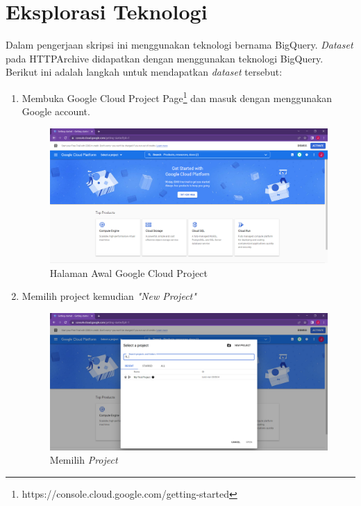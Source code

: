 \section{Eksplorasi Teknologi}
Dalam pengerjaan skripsi ini menggunakan teknologi bernama BigQuery. \textit{Dataset} pada HTTPArchive didapatkan dengan menggunakan teknologi BigQuery.
Berikut ini adalah langkah untuk mendapatkan \textit{dataset} tersebut:
\begin{enumerate}
	\item Membuka Google Cloud Project Page\footnote{https://console.cloud.google.com/getting-started} dan masuk dengan menggunakan Google account.
	\begin{figure}[H]
		\centering  
		\includegraphics[scale=0.35]{Gambar/Google BigQuery HomePage.PNG}  
		\caption{Halaman Awal Google Cloud Project} 
		\label{fig:GCP_HP} 
	\end{figure}
	
	\item Memilih project kemudian \textit{"New Project"}
	\begin{figure}[H]
		\centering  
		\includegraphics[scale=0.35]{Gambar/create_new_project.PNG}  
		\caption{Memilih \textit{Project}} 
		\label{fig:select_project} 
	\end{figure}
	

\end{enumerate}
